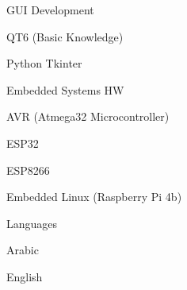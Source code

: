 \begin{cvskills}
 \cvskill
    {\normalsize GUI Development} %
        {
            \item QT6 (Basic Knowledge)
            \item Python Tkinter 
        }
  \cvskill
    {\normalsize Embedded Systems HW} %
        {
            \item AVR (Atmega32 Microcontroller)
            \item ESP32
            \item ESP8266
            \item Embedded Linux (Raspberry Pi 4b)
        }
  \cvskill
    {\normalsize Languages} %
        {
            \item Arabic\item English
        }

\end{cvskills}
